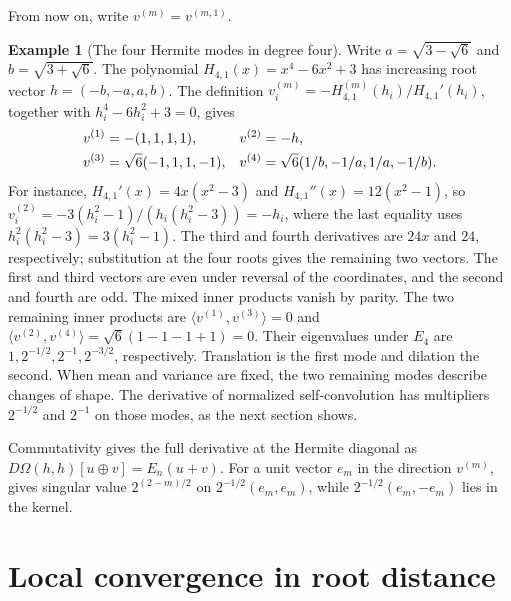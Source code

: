 \documentclass[12pt,reqno]{amsart}
\theoremstyle{definition}
\newtheorem{example}[example]{Example}
\theoremstyle{remark}
\begin{document}
From now on, write \(v^{(m)}=v^{(m,1)}\).

\begin{example}[The four Hermite modes in degree four]
\label{ex:degree-four-modes}
Write \(a=\sqrt{3-\sqrt6}\) and \(b=\sqrt{3+\sqrt6}\).
The polynomial \(H_{4,1}(x)=x^4-6x^2+3\) has increasing root vector
\(h=(-b,-a,a,b)\).  The definition
\(v_i^{(m)}=-H_{4,1}^{(m)}(h_i)/H_{4,1}'(h_i)\), together with
\(h_i^4-6h_i^2+3=0\), gives
\begin{align}\label{eq:degree-four-modes}
 v^{(1)}&=-(1,1,1,1),&
 v^{(2)}&=-h,\notag\\
 v^{(3)}&=\sqrt6(-1,1,1,-1),&
 v^{(4)}&=\sqrt6(1/b,-1/a,1/a,-1/b).
\end{align}
For instance, \(H_{4,1}'(x)=4x(x^2-3)\) and
\(H_{4,1}''(x)=12(x^2-1)\), so
\(v_i^{(2)}=-3(h_i^2-1)/(h_i(h_i^2-3))=-h_i\), where the last equality
uses \(h_i^2(h_i^2-3)=3(h_i^2-1)\).
The third and fourth derivatives are \(24x\) and \(24\), respectively;
substitution at the four roots gives the remaining two vectors.
The first and third vectors are even under reversal of the coordinates,
and the second and fourth are odd.  The mixed inner products vanish by
parity.  The two remaining inner products are
\(\langle v^{(1)},v^{(3)}\rangle=0\) and
\(\langle v^{(2)},v^{(4)}\rangle=\sqrt6(1-1-1+1)=0\).
Their eigenvalues under \(E_4\) are
\(1,2^{-1/2},2^{-1},2^{-3/2}\), respectively.
Translation is the first mode and dilation the second.  When mean and
variance are fixed, the two remaining modes describe changes of shape.
The derivative of normalized self-convolution has multipliers
\(2^{-1/2}\) and \(2^{-1}\) on those modes, as the next section shows.
\end{example}

Commutativity gives the full derivative at the Hermite diagonal as
\(D\Omega(h,h)[u\oplus v]=E_n(u+v)\).  For a unit vector
\(e_m\) in the direction \(v^{(m)}\),
 gives singular value
\(2^{(2-m)/2}\) on \(2^{-1/2}(e_m,e_m)\), while
\(2^{-1/2}(e_m,-e_m)\) lies in the kernel.

\section{Local convergence in root distance}
\label{sec:local-dynamics}
\end{document}
